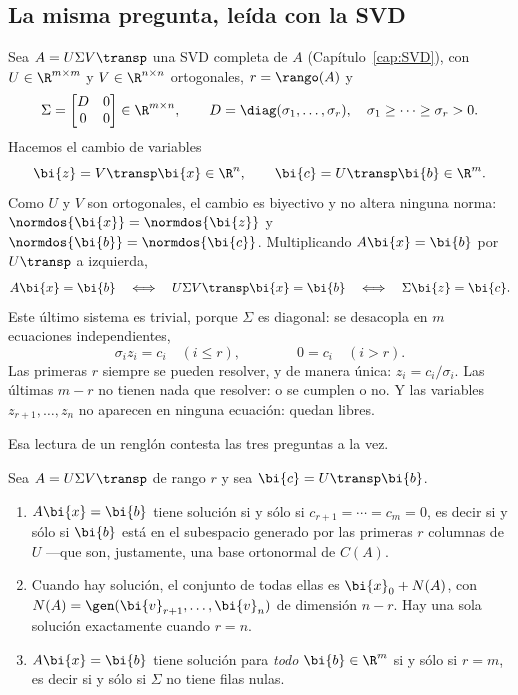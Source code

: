 \subsection{La misma pregunta, leída con la SVD}\label{mc-sec:svd-consistencia}

Sea $A=U\Sigma V\transp$ una SVD completa de $A$
(Capítulo~\ref{cap:SVD}), con $U\in\R^{m\times m}$ y $V\in\R^{n\times n}$
ortogonales, $r=\rango(A)$ y
\[
\Sigma=\begin{bmatrix}D&0\\ 0&0\end{bmatrix}\in\R^{m\times n},
\qquad D=\diag(\sigma_1,\dots,\sigma_r),\quad \sigma_1\ge\cdots\ge\sigma_r>0 .
\]
Hacemos el cambio de variables
\begin{equation}\label{mc-eq:cambio}
\bi{z}=V\transp\bi{x}\in\R^n ,\qquad \bi{c}=U\transp\bi{b}\in\R^m .
\end{equation}
Como $U$ y $V$ son ortogonales, el cambio es biyectivo y no altera ninguna
norma: $\normdos{\bi{x}}=\normdos{\bi{z}}$ y $\normdos{\bi{b}}=\normdos{\bi{c}}$.
Multiplicando $A\bi{x}=\bi{b}$ por $U\transp$ a izquierda,
\[
A\bi{x}=\bi{b}
\quad\Longleftrightarrow\quad
U\Sigma V\transp\bi{x}=\bi{b}
\quad\Longleftrightarrow\quad
\Sigma\bi{z}=\bi{c} .
\]
Este último sistema es trivial, porque $\Sigma$ es diagonal: se desacopla en
$m$ ecuaciones independientes,
\begin{equation}\label{mc-eq:desacoplado}
\sigma_i z_i = c_i\quad (i\le r),
\qquad\qquad
0 = c_i\quad (i>r).
\end{equation}
Las primeras $r$ siempre se pueden resolver, y de manera única:
$z_i=c_i/\sigma_i$. Las últimas $m-r$ no tienen nada que resolver: o se
cumplen o no. Y las variables $z_{r+1},\dots,z_n$ no aparecen en ninguna
ecuación: quedan libres.

Esa lectura de un renglón contesta las tres preguntas a la vez.

\begin{theorem}\label{mc-teo:consistencia}
Sea $A=U\Sigma V\transp$ de rango $r$ y sea $\bi{c}=U\transp\bi{b}$.
\begin{enumerate}[label=\textup{(\alph*)},leftmargin=*]
\item $A\bi{x}=\bi{b}$ tiene solución si y sólo si
$c_{r+1}=\cdots=c_m=0$, es decir si y sólo si $\bi{b}$ está en el subespacio
generado por las primeras $r$ columnas de $U$ ---que son, justamente, una base
ortonormal de $C(A)$.
\item Cuando hay solución, el conjunto de todas ellas es
$\bi{x}_0+N(A)$, con $N(A)=\gen(\bi{v}_{r+1},\dots,\bi{v}_n)$ de dimensión
$n-r$. Hay una sola solución exactamente cuando $r=n$.
\item $A\bi{x}=\bi{b}$ tiene solución para \emph{todo} $\bi{b}\in\R^m$ si y
sólo si $r=m$, es decir si y sólo si $\Sigma$ no tiene filas nulas.
\end{enumerate}
\end{theorem}

